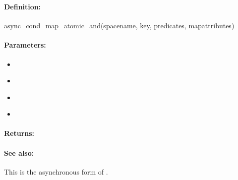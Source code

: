 \pagebreak
\subsubsection{}
\label{api:ruby:async_cond_map_atomic_and}


\paragraph{Definition:}
\begin{rubycode}
async_cond_map_atomic_and(spacename, key, predicates, mapattributes)
\end{rubycode}

\paragraph{Parameters:}
\begin{itemize}[noitemsep]
\item {}\\

\item {}\\

\item {}\\

\item {}\\

\end{itemize}

\paragraph{Returns:}


\paragraph{See also:}  This is the asynchronous form of .

\pagebreak
\subsubsection{}
\label{api:ruby:map_atomic_or}


